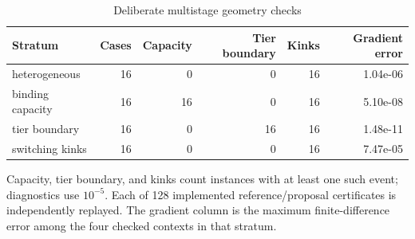 \begin{table}[p]
\centering
\caption{Deliberate multistage geometry checks}\label{tab:r19-geometry}
\setlength{\tabcolsep}{4pt}
\begin{tabular}{lrrrrr}
\toprule
Stratum & Cases & Capacity & Tier boundary & Kinks & Gradient error \\
\midrule
heterogeneous & 16 & 0 & 0 & 16 & 1.04e-06 \\
binding capacity & 16 & 16 & 0 & 16 & 5.10e-08 \\
tier boundary & 16 & 0 & 16 & 16 & 1.48e-11 \\
switching kinks & 16 & 0 & 0 & 16 & 7.47e-05 \\
\bottomrule
\end{tabular}

\par\medskip\begin{minipage}{\textwidth}Capacity, tier boundary, and kinks count instances with at least one such event; diagnostics use $10^{-5}$. Each of 128 implemented reference/proposal certificates is independently replayed. The gradient column is the maximum finite-difference error among the four checked contexts in that stratum.\end{minipage}
\end{table}
